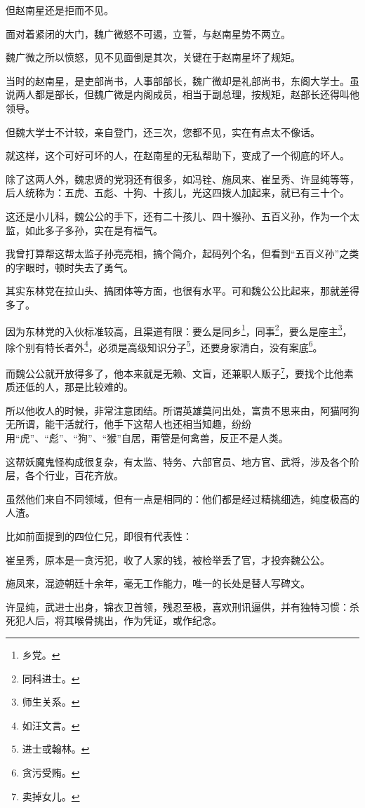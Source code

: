 \begin{multicols}{\theparacolNo}
		但赵南星还是拒而不见。

		面对着紧闭的大门，魏广微怒不可遏，立誓，与赵南星势不两立。

		魏广微之所以愤怒，见不见面倒是其次，关键在于赵南星坏了规矩。

		当时的赵南星，是吏部尚书，人事部部长，魏广微却是礼部尚书，东阁大学士。虽说两人都是部长，但魏广微是内阁成员，相当于副总理，按规矩，赵部长还得叫他领导。

		但魏大学士不计较，亲自登门，还三次，您都不见，实在有点太不像话。

		就这样，这个可好可坏的人，在赵南星的无私帮助下，变成了一个彻底的坏人。

		除了这两人外，魏忠贤的党羽还有很多，如冯铨、施凤来、崔呈秀、许显纯等等，后人统称为：五虎、五彪、十狗、十孩儿，光这四拨人加起来，就已有三十个。

		这还是小儿科，魏公公的手下，还有二十孩儿、四十猴孙、五百义孙，作为一个太监，如此多子多孙，实在是有福气。

		我曾打算帮这帮太监子孙亮亮相，搞个简介，起码列个名，但看到“五百义孙”之类的字眼时，顿时失去了勇气。

		其实东林党在拉山头、搞团体等方面，也很有水平。可和魏公公比起来，那就差得多了。

		因为东林党的入伙标准较高，且渠道有限：要么是同乡\footnote{乡党。}，同事\footnote{同科进士。}，要么是座主\footnote{师生关系。}，除个别有特长者外\footnote{如汪文言。}，必须是高级知识分子\footnote{进士或翰林。}，还要身家清白，没有案底\footnote{贪污受贿。}。

		而魏公公就开放得多了，他本来就是无赖、文盲，还兼职人贩子\footnote{卖掉女儿。}，要找个比他素质还低的人，那是比较难的。

		所以他收人的时候，非常注意团结。所谓英雄莫问出处，富贵不思来由，阿猫阿狗无所谓，能干活就行，他手下这帮人也还相当知趣，纷纷用“虎”、“彪”、“狗”、“猴”自居，甭管是何禽兽，反正不是人类。

		这帮妖魔鬼怪构成很复杂，有太监、特务、六部官员、地方官、武将，涉及各个阶层，各个行业，百花齐放。

		虽然他们来自不同领域，但有一点是相同的：他们都是经过精挑细选，纯度极高的人渣。

		比如前面提到的四位仁兄，即很有代表性：

		崔呈秀，原本是一贪污犯，收了人家的钱，被检举丢了官，才投奔魏公公。

		施凤来，混迹朝廷十余年，毫无工作能力，唯一的长处是替人写碑文。

		许显纯，武进士出身，锦衣卫首领，残忍至极，喜欢刑讯逼供，并有独特习惯：杀死犯人后，将其喉骨挑出，作为凭证，或作纪念。


\end{multicols}
